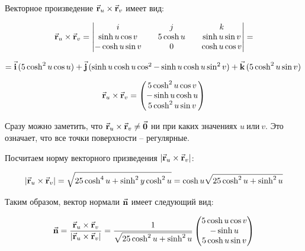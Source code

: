 \documentclass[12pt,a4paper]{article}
\begin{document}
    Векторное произведение $ \vec{\textbf r}_u \times  \vec{\textbf r}_v $ имеет вид:

    \[
        \vec{\textbf r}_u \times  \vec{\textbf r}_v = 
            \begin{vmatrix}
                i && j && k
                \\
                \sinh u \cos v && 5\cosh u && \sinh u \sin v
                \\
                -\cosh u \sin v && 0 && \cosh u \cos v
            \end{vmatrix}
        =
    \]

    \bigskip

    \noindent $ = \vec{\textbf i}\,(5 \cosh^2 u \cos u ) + \vec{\textbf j}\,(\sinh u \cosh u \cos^2 - \sinh u \cosh u \sin^2 v) + \vec{\textbf k}\,(5 \cosh^2 u \sin v) $

    \[
        \vec{\textbf r}_u \times \vec{\textbf r}_v =
        \begin{pmatrix}
            5 \cosh^2 u \cos v
            \\
            -\sinh u \cosh u
            \\
            5 \cosh^2 u \sin v
        \end{pmatrix}
    \]

    Сразу можно заметить, что $ \vec{\textbf r}_u \times \vec{\textbf r}_v \ne \vec{\textbf 0}$ ни при каких значениях $ u \ \text{или} \ v $. Это означает, что все точки поверхности -- регулярные.

    \pagebreak

    Посчитаем норму векторного призведения $ | \vec{\textbf r}_u \times \vec{\textbf r}_v | $: 

    \[
        | \vec{\textbf r}_u \times \vec{\textbf r}_v | = \sqrt{25 \cosh^4 u + \sinh^2 y \cosh^2 u} = \cosh u \sqrt { 25 \cosh^2 u + \sinh^2 u } 
    \]

    Таким образом, вектор нормали $ \vec{\textbf n} $ имеет следующий вид: 
    
    \[
        \vec{\textbf n} = \frac{\vec{\textbf r}_u \times \vec{\textbf r}_v}{| \vec{\textbf r}_u \times \vec{\textbf r}_v |} = \frac{1}{\sqrt{25 \cosh^2 u + \sinh^2 u}}
        \begin{pmatrix}
            5 \cosh u \cos v
            \\
            -\sinh u
            \\
            5 \cosh u \sin v
        \end{pmatrix}
    \]
\end{document}

